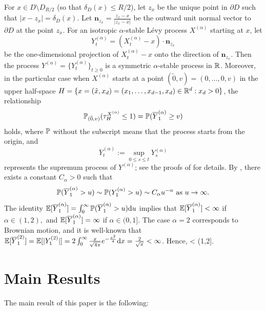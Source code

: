 \documentclass[11pt]{article}
\begin{document}
\begin{doublespace}
For $x\in D\setminus D_{R/2}$ (so that $\delta_D(x)\le R/2$), let $z_x$ be the unique point in $\partial D$ such that $|x-z_x|=\delta_{D}(x)$.
Let $\mathbf{n}_{z_{x}}=\frac{z_{x}-x}{|z_x-x|}$ be the outward unit normal vector to $\partial D$ at the point $z_x$. For an isotropic $\alpha$-stable L\'evy process $X^{(\alpha)}$ starting at $x$, let 
\[
	Y^{(\alpha)}_{t}= (X^{(\alpha)}_{t}-x)\cdot \mathbf{n}_{z_{x}}
\]
be the one-dimensional projection of $X^{(\alpha)}_{t}-x$ onto the direction of $\mathbf{n}_{z_{x}}$. 
Then the process $Y^{(\alpha)}=\{Y^{(\alpha)}_t\}_{t\ge 0}$ is a symmetric $\alpha$-stable process in $\R$. Moreover, in the particular case when $X^{(\alpha)}$ starts at a point $(\tilde{0}, v)=(0,\ldots,0,v)$ in the upper half-space $H=\{x=(\tilde{x}, x_{d})=(x_1,\ldots,x_{d-1},x_d)\in \R^d : x_{d}>0\}$, the relationship 
\begin{align}\label{Xalpha-Yalpha}
	\P_{(\tilde{0},v)}(\tau_{H}^{X^{(\alpha)}}\le 1)=\P(\overline{Y}_{1}^{(\alpha)}\ge v) 
\end{align}
holds, where $\P$ without the subscript means that the process starts from the origin, and
\[
\overline{Y}^{(\alpha)}_{t}:=\sup_{0\leq s\leq t}Y^{(\alpha)}_{s} 
\]
 represents the supremum process of $Y^{(\alpha)}$; see the proofs of \cite[Lemma 3.1, Proposition 3.3]{PS22} for details. By \cite[Proposition 4 in Section VIII.1]{Ber}, there exists a constant $C_\alpha>0$ such that
\[
\P(\overline{Y}^{(\alpha)}_1>u)\sim\P(Y^{(\alpha)}_1>u)\sim C_\alpha u^{-\alpha} 
\text{ as } u\to \infty.
\]
The identity $\E[\overline{Y}_{1}^{(\alpha)}]=\int_{0}^{\infty}\P(\overline{Y}_{1}^{(\alpha)}>u)\ud u$ implies that
$\E[\overline{Y}_{1}^{(\alpha)}] <\infty$ if $\alpha\in (1,2),$ and $\E[\overline{Y}_{1}^{(\alpha)}] =\infty$ if $\alpha\in (0,1].$
The case $\alpha=2$ corresponds to Brownian motion, and it is well-known that $\E[\overline{Y}_{1}^{(2)}]=\E[|Y_1^{(2)}|]=2\int_{0}^{\infty}\frac{x}{\sqrt{4\pi}}e^{-\frac{x^2}{4}}\ud x=\frac{2}{\sqrt{\pi}}<\infty$.
Hence, 
\beq\label{eqn:finite mean}
<\infty {} \alpha\in (1,2].
\eeq






\section{Main Results}\label{section:main}

The main result of this paper is the following: 



\end{doublespace}
\end{document}
